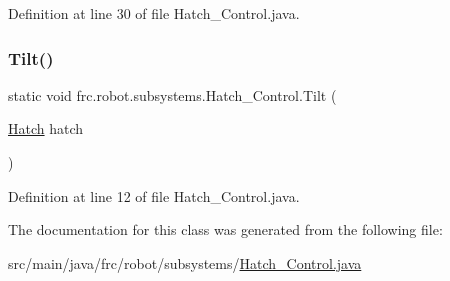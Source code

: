 Definition at line 30 of file Hatch\+\_\+\+Control.\+java.

\mbox{\label{classfrc_1_1robot_1_1subsystems_1_1Hatch__Control_a10439efd71fc486d24b95364d70dcde3}} 
\subsubsection{\texorpdfstring{Tilt()}{Tilt()}}
{\footnotesize\ttfamily static void frc.\+robot.\+subsystems.\+Hatch\+\_\+\+Control.\+Tilt (\begin{DoxyParamCaption}\item[{\hyperlink{enumfrc_1_1robot_1_1Enums_1_1Hatch}{Hatch}}]{hatch }\end{DoxyParamCaption})\hspace{0.3cm}{\ttfamily [static]}}



Definition at line 12 of file Hatch\+\_\+\+Control.\+java.



The documentation for this class was generated from the following file\+:\begin{DoxyCompactItemize}
\item 
src/main/java/frc/robot/subsystems/\hyperlink{Hatch__Control_8java}{Hatch\+\_\+\+Control.\+java}\end{DoxyCompactItemize}
